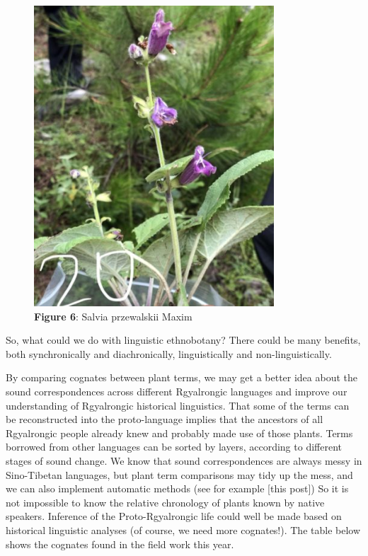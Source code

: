 \documentclass[
  a4paper,
  14pt,
  oneside,
  tablecaptionabove
]{scrbook}
\begin{document}
\begin{figure}[h!]
\centering
\includegraphics[width=0.8\textwidth]{images/2711575733084_.pic_hd-399x500.jpg}
\captionsetup{labelformat=empty}
\caption{\textbf{Figure 6}: Salvia przewalskii Maxim}
\end{figure}




So, what could we do with linguistic ethnobotany? There could be many
benefits, both synchronically and diachronically, linguistically and
non-linguistically.

By comparing cognates between plant terms, we may get a better idea
about the sound correspondences across different Rgyalrongic languages
and improve our understanding of Rgyalrongic historical linguistics.
That some of the terms can be reconstructed into the proto-language
implies that the ancestors of all Rgyalrongic people already knew and
probably made use of those plants. Terms borrowed from other languages
can be sorted by layers, according to different stages of sound change.
We know that sound correspondences are always messy in Sino-Tibetan
languages, but plant term comparisons may tidy up the mess, and we can
also implement automatic methods (see for example {[}this post{]}) So it
is not impossible to know the relative chronology of plants known by
native speakers. Inference of the Proto-Rgyalrongic life could well be
made based on historical linguistic analyses (of course, we need more
cognates!). The table below shows the cognates found in the field work
this year.
\end{document}
